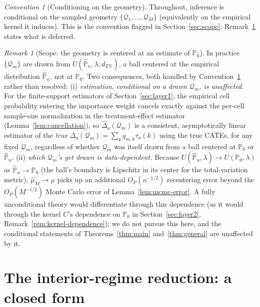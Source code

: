 \documentclass[11pt]{article}
\theoremstyle{plain}
\theoremstyle{definition}
\theoremstyle{remark}
\newtheorem{remark}[theorem]{Remark}
\newtheorem{convention}[theorem]{Convention}
\newcommand{\PP}{\mathbb{P}}
\newcommand{\Pn}{\widehat{\PP}_n}
\newcommand{\Q}{\mathcal{Q}}
\begin{document}
\begin{convention}[Conditioning on the geometry]\label{conv:geometry}
Throughout, inference is conditional on the sampled geometry $\{\Q_1,\dots,\Q_M\}$
(equivalently on the empirical kernel it induces). This is the convention flagged in
Section~\ref{sec:scope}; Remark~\ref{rem:geometry-scope} states what is deferred.
\end{convention}

\begin{remark}[Scope: the geometry is centered at an estimate of $\PP_0$]\label{rem:geometry-scope}
In practice $\{\Q_m\}$ are drawn from $U(\Pn,\lambda;d_{\mathrm{TV}})$, a ball centered at
the empirical distribution $\Pn$, not at $\PP_0$. Two consequences, both handled by
Convention~\ref{conv:geometry} rather than resolved: (i) \emph{estimation, conditional
on a drawn $\Q_m$, is unaffected.} For the finite-support estimators of
Section~\ref{sec:layer1}, the empirical cell probability entering the importance
weight cancels exactly against the per-cell sample-size normalization in the
treatment-effect estimator (Lemma~\ref{lem:cancellation}), so $\hat\Delta_a(\Q_m)$ is a
consistent, asymptotically linear estimator of the \emph{true}
$\Delta_a(\Q_m)=\sum_k q_{m,k}\tau_a(k)$ using the true CATEs, for any fixed $\Q_m$,
regardless of whether $\Q_m$ was itself drawn from a ball centered at $\PP_0$ or
$\Pn$. (ii) \emph{which $\Q_m$'s get drawn is data-dependent.} Because
$U(\Pn,\lambda)\to U(\PP_0,\lambda)$ as $\Pn\to\PP_0$ (the ball's boundary is Lipschitz
in its center for the total-variation metric), $\hat\mu_M\to\mu$ picks up an additional
$O_P(n^{-1/2})$ recentering error beyond the $O_P(M^{-1/2})$ Monte Carlo error of
Lemma~\ref{lem:mcmc-error}. A fully unconditional theory would differentiate through
this dependence (as it would through the kernel $C$'s dependence on $\PP_0$ in
Section~\ref{sec:layer2}, Remark~\ref{rem:kernel-dependence}); we do not pursue this
here, and the conditional statements of Theorems~\ref{thm:main} and~\ref{thm:general}
are unaffected by it.
\end{remark}

\section{The interior-regime reduction: a closed form}\label{sec:interior}
\end{document}
